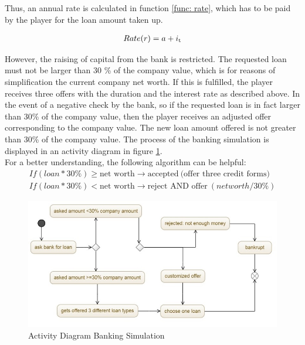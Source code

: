 Thus, an annual rate is calculated in function \ref{func: rate}, which has to be paid by the player for the loan amount taken up.

\begin{equation}
\label{func: rate}
\begin{aligned}
Rate (r)= a+ i\textsubscript{t}
\end{aligned}    
\end{equation}


However, the raising of capital from the bank is restricted.
The requested loan must not be larger than 30 \% of the company value, which is for reasons of simplification the current company net worth. If this is fulfilled, the player receives three offers with the duration and the interest rate as described above. In the event of a negative check by the bank, so if the requested loan is in fact larger than 30\% of the company value, then the player receives an adjusted offer corresponding to the company value. The new loan amount offered is not greater than 30\% of the company value. The process of the banking simulation is displayed in an activity diagram in figure \ref{jpg:banking}.\\
For a better understanding, the following algorithm can be helpful:
\begin{equation}
\begin{aligned}
If (loan * 30\% ) \geq  \text{net worth} \xrightarrow{} \text{accepted} \ \text{(offer three credit forms)} \\
If (loan * 30\%) < \text{net worth} \xrightarrow{} \text{reject AND offer} \ (net worth / 30\%)
\end{aligned}    
\end{equation}

\begin{figure}
	\centering
	\includegraphics[width=12cm]{images/banking_activity_diagram.jpg}
	\caption{Activity Diagram Banking Simulation}
	\label{jpg:banking}
\end{figure}

